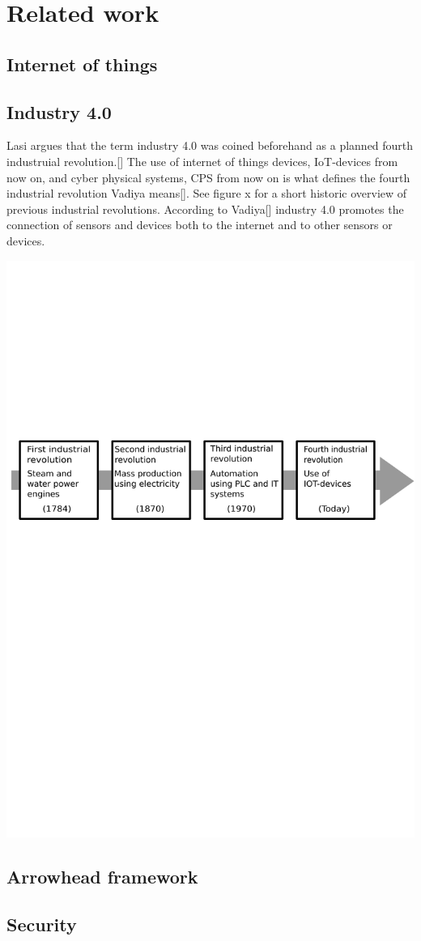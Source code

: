 \section{Related work}
\subsection{Internet of things}
\subsection{Industry 4.0}
Lasi argues that the term industry 4.0 was coined beforehand as a planned fourth industruial revolution.[] 
The use of internet of things devices, IoT-devices from now on, and cyber physical systems, CPS from now on is what defines the fourth industrial revolution Vadiya means[].
See figure x for a short historic overview of previous industrial revolutions.
According to Vadiya[] industry 4.0 promotes the connection of sensors and devices both to the internet and to other sensors or devices.



\includegraphics[width=\textwidth]{Pictures/Industrial_revolution.pdf}
\subsection{Arrowhead framework}
\subsection{Security}
